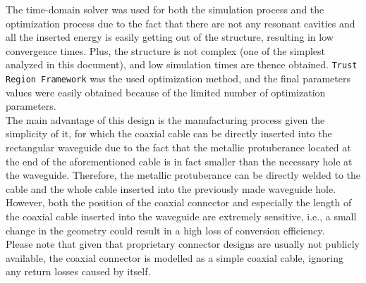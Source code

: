 \documentclass[english,twoside]{article}
\begin{document}
    The time-domain solver was used for both the simulation process and the optimization process due to the fact that there are not any resonant cavities and all the inserted energy is easily getting out of the structure, resulting in low convergence times. Plus, the structure is not complex (one of the simplest analyzed in this document), and low simulation times are thence obtained. \texttt{Trust Region Framework} was the used optimization method, and the final parameters values were easily obtained because of the limited number of optimization parameters.\\
    
    The main advantage of this design is the manufacturing process given the simplicity of it, for which the coaxial cable can be directly inserted into the rectangular waveguide due to the fact that the metallic protuberance located at the end of the aforementioned cable is in fact smaller than the necessary hole at the waveguide. Therefore, the metallic protuberance can be directly welded to the cable and the whole cable inserted into the previously made waveguide hole. However, both the position of the coaxial connector and especially the length of the coaxial cable inserted into the waveguide are extremely sensitive, i.e., a small change in the geometry could result in a high loss of conversion efficiency.\\
    
    Please note that given that proprietary connector designs are usually not publicly available, the coaxial connector is modelled as a simple coaxial cable, ignoring any return losses caused by itself.
		
\end{document}
